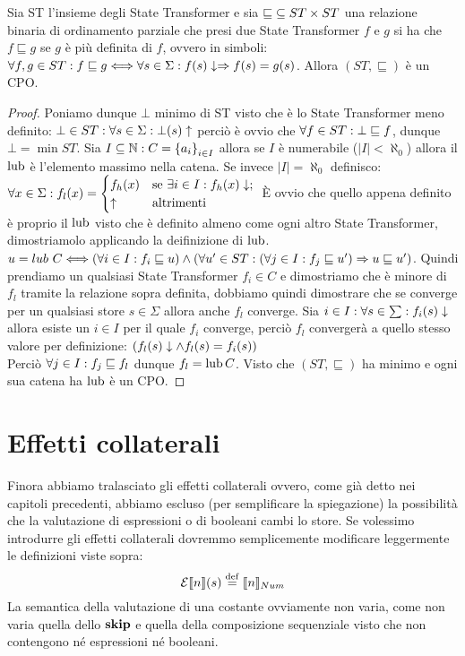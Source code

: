 \begin{proposizione} 
Sia ST l'insieme degli State Transformer e sia $\mathord{\sqsubseteq}\subseteq ST\times ST$ una relazione binaria di ordinamento parziale che presi due State Transformer $f$ e $g$ si ha che $f \sqsubseteq g$ se $g$ è più definita di $f$, ovvero in simboli: $\forall f,g \in ST \mathrel{:} f \sqsubseteq g \Longleftrightarrow \forall s \in \Sigma \mathrel{:} f(s)\downarrow \Rightarrow f(s) = g(s)$. Allora $(ST, \sqsubseteq)$ è un CPO.
\end{proposizione}
\begin{proof}
Poniamo dunque $\bot$ minimo di ST visto che è lo State Transformer meno definito: $\bot \in ST \mathrel{:} \forall s \in \Sigma \mathrel{:} \bot(s)\uparrow$ perciò è ovvio che $\forall f \in ST \mathrel{:} \bot \sqsubseteq f$, dunque $\bot = \min ST$. 
Sia $I \subseteq \mathbb{N} \mathrel{:} C = \left\{a_i\right\}_{i \in I}$ allora se $I$ è numerabile ($|I| < \aleph_0$) allora il $\mathop{\mathrm{lub}}\nolimits$ è l'elemento massimo nella catena. Se invece $|I| = \aleph_0$ definisco:
        $\forall x \in \Sigma \mathrel{:} f_l(x) =
    \begin{cases}
      f_h(x) & \text{se } \exists i \in I : f_h(x)\downarrow;\\
      \uparrow & \text{altrimenti}
    \end{cases}\\ $
È ovvio che quello appena definito è proprio il $\mathop{\mathrm{lub}}\nolimits$ visto che è definito almeno come ogni altro State Transformer, dimostriamolo applicando la deifinizione di $\mathop{\mathrm{lub}}\nolimits$.
$u = lub\ C \Longleftrightarrow (\forall i \in I \mathrel{:} f_i \sqsubseteq u) \land (\forall u' \in ST \mathrel{:} (\forall j \in I \mathrel{:} f_j \sqsubseteq u') \Rightarrow u \sqsubseteq u')$.
Quindi prendiamo un qualsiasi State Transformer $f_i \in C$ e dimostriamo che è minore di $f_l$ tramite la relazione sopra definita, dobbiamo quindi dimostrare che se converge per un qualsiasi store $s \in \Sigma$ allora anche $f_l$ converge. Sia $i \in I \mathrel{:} \forall s \in \sum \mathrel{:} f_i(s)\downarrow$ allora esiste un $i \in I$ per il quale $f_i$ converge, perciò $f_l$ convergerà a quello stesso valore per definizione: $(f_l(s)\downarrow \land f_l(s)=f_i(s))$\\
Perciò $\forall j \in I \mathrel{:} f_j \sqsubseteq f_l$ dunque  $f_l = \mathop{\mathrm{lub}}\nolimits C$. Visto che $(ST, \sqsubseteq)$ ha minimo e ogni sua catena ha $\mathop{\mathrm{lub}}\nolimits$ è un CPO.
\end{proof}

\section{Effetti collaterali} 
Finora abbiamo tralasciato gli effetti collaterali ovvero, come già detto nei capitoli precedenti, abbiamo escluso (per semplificare la spiegazione) la possibilità che la valutazione di espressioni o di booleani cambi lo store. Se volessimo introdurre gli effetti collaterali dovremmo semplicemente modificare leggermente le definizioni viste sopra:
$$ \denot{\calE}{n}{s} \defeq \llbracket n \rrbracket_{Num}$$
La semantica della valutazione di una costante ovviamente non varia, come non varia quella dello $\mathop{\textup{\textbf{skip}}}$ e quella della composizione sequenziale visto che non contengono né espressioni né booleani.

